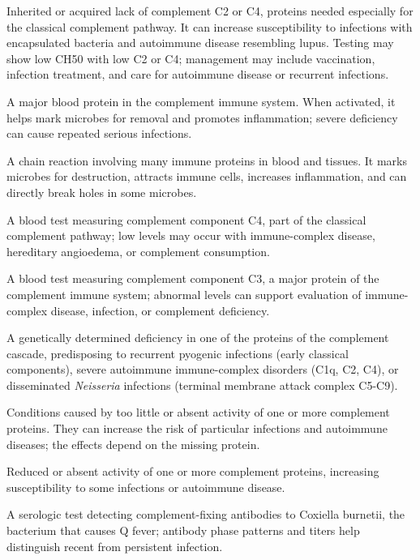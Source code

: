  Inherited or acquired lack of complement C2 or C4, proteins needed especially for the classical complement pathway. It can increase susceptibility to infections with encapsulated bacteria and autoimmune disease resembling lupus. Testing may show low CH50 with low C2 or C4; management may include vaccination, infection treatment, and care for autoimmune disease or recurrent infections.

 A major blood protein in the complement immune system. When activated, it helps mark microbes for removal and promotes inflammation; severe deficiency can cause repeated serious infections.

 A chain reaction involving many immune proteins in blood and tissues. It marks microbes for destruction, attracts immune cells, increases inflammation, and can directly break holes in some microbes.

 A blood test measuring complement component C4, part of the classical complement pathway; low levels may occur with immune-complex disease, hereditary angioedema, or complement consumption.

 A blood test measuring complement component C3, a major protein of the complement immune system; abnormal levels can support evaluation of immune-complex disease, infection, or complement deficiency.

 A genetically determined deficiency in one of the proteins of the complement cascade, predisposing to recurrent pyogenic infections (early classical components), severe autoimmune immune-complex disorders (C1q, C2, C4), or disseminated \textit{Neisseria} infections (terminal membrane attack complex C5-C9).

 Conditions caused by too little or absent activity of one or more complement proteins. They can increase the risk of particular infections and autoimmune diseases; the effects depend on the missing protein.

 Reduced or absent activity of one or more complement proteins, increasing susceptibility to some infections or autoimmune disease.

 A serologic test detecting complement-fixing antibodies to Coxiella burnetii, the bacterium that causes Q fever; antibody phase patterns and titers help distinguish recent from persistent infection.

